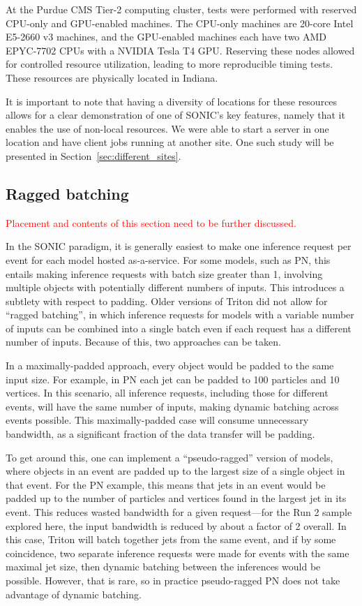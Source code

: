 At the Purdue CMS Tier-2 computing cluster, tests were performed with reserved CPU-only and GPU-enabled machines. The CPU-only machines are 20-core Intel E5-2660 v3 machines, and the GPU-enabled machines each have two AMD EPYC-7702 CPUs with a NVIDIA Tesla T4 GPU. Reserving these nodes allowed for controlled resource utilization, leading to more reproducible timing tests. These resources are physically located in Indiana.

It is important to note that having a diversity of locations for these resources allows for a clear demonstration of one of SONIC's key features, namely that it enables the use of non-local resources. We were able to start a server in one location and have client jobs running at another site. One such study will be presented in Section~\ref{sec:different_sites}.


\subsection{Ragged batching}
\label{sec:ragged}

\textcolor{red}{Placement and contents of this section need to be further discussed.}

In the SONIC paradigm, it is generally easiest to make one inference request per event for each model hosted as-a-service. For some models, such as PN, this entails making inference requests with batch size greater than 1, involving multiple objects with potentially different numbers of inputs. This introduces a subtlety with respect to padding. Older versions of Triton did not allow for ``ragged batching'', in which inference requests for models with a variable number of inputs can be combined into a single batch even if each request has a different number of inputs. Because of this, two approaches can be taken.

In a maximally-padded approach, every object would be padded to the same input size. For example, in PN each jet can be padded to 100 particles and 10 vertices. In this scenario, all inference requests, including those for different events, will have the same number of inputs, making dynamic batching across events possible. This maximally-padded case will consume unnecessary bandwidth, as a significant fraction of the data transfer will be padding.

To get around this, one can implement a ``pseudo-ragged'' version of models, where objects in an event are padded up to the largest size of a single object in that event. For the PN example, this means that jets in an event would be padded up to the number of particles and vertices found in the largest jet in its event. This reduces wasted bandwidth for a given request---for the Run 2 \ttbar sample explored here, the input bandwidth is reduced by about a factor of 2 overall. In this case, Triton will batch together jets from the same event, and if by some coincidence, two separate inference requests were made for events with the same maximal jet size, then dynamic batching between the inferences would be possible. However, that is rare, so in practice pseudo-ragged PN does not take advantage of dynamic batching.

